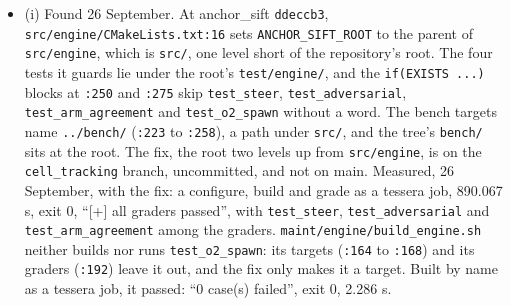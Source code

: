 \begin{enumerate}
\begin{itemize}
\item (i) Found 26 September. At anchor\_\allowbreak{}sift \texttt{ddeccb3}, \texttt{src/\allowbreak{}engine/\allowbreak{}CMake\allowbreak{}Lists.\allowbreak{}txt:16} sets \texttt{ANCHOR\_\allowbreak{}SIFT\_\allowbreak{}ROOT} to the parent of \texttt{src/\allowbreak{}engine}, which is \texttt{src/\allowbreak{}}, one level short of the repository's root. The four tests it guards lie under the root's \texttt{test/\allowbreak{}engine/\allowbreak{}}, and the \texttt{if(EXISTS ...)} blocks at \texttt{:250} and \texttt{:275} skip \texttt{test\_\allowbreak{}steer}, \texttt{test\_\allowbreak{}adversarial}, \texttt{test\_\allowbreak{}arm\_\allowbreak{}agreement} and \texttt{test\_\allowbreak{}o2\_\allowbreak{}spawn} without a word. The bench targets name \texttt{../\allowbreak{}bench/\allowbreak{}} (\texttt{:223} to \texttt{:258}), a path under \texttt{src/\allowbreak{}}, and the tree's \texttt{bench/\allowbreak{}} sits at the root. The fix, the root two levels up from \texttt{src/\allowbreak{}engine}, is on the \texttt{cell\_\allowbreak{}tracking} branch, uncommitted, and not on main. Measured, 26 September, with the fix: a configure, build and grade as a tessera job, 890.067 s, exit 0, “[+] all graders passed”, with \texttt{test\_\allowbreak{}steer}, \texttt{test\_\allowbreak{}adversarial} and \texttt{test\_\allowbreak{}arm\_\allowbreak{}agreement} among the graders. \texttt{maint/\allowbreak{}engine/\allowbreak{}build\_\allowbreak{}engine.\allowbreak{}sh} neither builds nor runs \texttt{test\_\allowbreak{}o2\_\allowbreak{}spawn}: its targets (\texttt{:164} to \texttt{:168}) and its graders (\texttt{:192}) leave it out, and the fix only makes it a target. Built by name as a tessera job, it passed: “0 case(s) failed”, exit 0, 2.286 s.


\end{itemize}
\end{enumerate}
